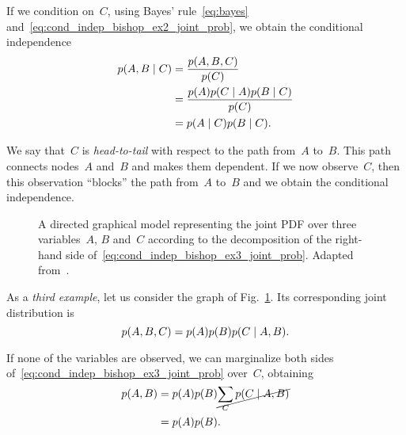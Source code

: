 If we condition on~$C$, using Bayes' rule~\eqref{eq:bayes} and~\eqref{eq:cond_indep_bishop_ex2_joint_prob}, we obtain the conditional independence
\begin{align*}
\begin{split}
  p(A,B \mid C) &= \frac{p(A,B,C)}{p(C)} \\
                  &= \frac{p(A) p(C \mid A) p(B \mid C)}{p(C)} \\
                  &= p(A \mid C) p(B \mid C).
\end{split}
\end{align*}

We say that~$C$ is \emph{head-to-tail} with respect to the path from~$A$ to~$B$. \label{head_to_tail}
This path connects nodes~$A$ and~$B$ and makes them dependent.
If we now observe~$C$, then this observation ``blocks'' the path from~$A$ to~$B$ and we obtain the conditional independence.

\begin{figure}
\centering
{}
\caption[A directed graphical model representing the joint \acf{PDF} over the variables of~\eqref{eq:cond_indep_bishop_ex3_joint_prob}.]{A directed graphical model representing the joint \acf{PDF} over three variables~$A$, $B$ and~$C$ according to the decomposition of the right-hand side of~\eqref{eq:cond_indep_bishop_ex3_joint_prob}. Adapted from~\cite{bishop:prml}.}
\label{fig:cond_indep_bishop_ex3}
\end{figure}

As a \emph{third example}, let us consider the graph of Fig.~\ref{fig:cond_indep_bishop_ex3}.
Its corresponding joint distribution is
\begin{equation} \label{eq:cond_indep_bishop_ex3_joint_prob}
  p(A,B,C) = p(A) p(B) p(C \mid A,B).
\end{equation}

If none of the variables are observed, we can marginalize both sides of~\eqref{eq:cond_indep_bishop_ex3_joint_prob} over~$C$, obtaining
\begin{align} \label{eq:cond_indep_bishop_ex3_no_vars_observed}
\begin{split}
  p(A,B) &= p(A) p(B) \cancel{\sum_C p(C \mid A,B)} \\
         &= p(A) p(B).
\end{split}
\end{align}

